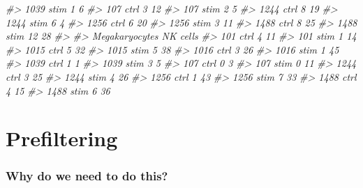 \documentclass[
]{book}
\newenvironment{Shaded}{\begin{snugshade}}{\end{snugshade}}
\newcommand{\CommentTok}[1]{\textcolor[rgb]{0.56,0.35,0.01}{\textit{#1}}}
\begin{document}
\begin{Shaded}
\begin{Highlighting}[]
\CommentTok{\#\textgreater{}   1039 stim               1                 6}
\CommentTok{\#\textgreater{}   107 ctrl                3                12}
\CommentTok{\#\textgreater{}   107 stim                2                 5}
\CommentTok{\#\textgreater{}   1244 ctrl               8                19}
\CommentTok{\#\textgreater{}   1244 stim               6                 4}
\CommentTok{\#\textgreater{}   1256 ctrl               6                20}
\CommentTok{\#\textgreater{}   1256 stim               3                11}
\CommentTok{\#\textgreater{}   1488 ctrl               8                25}
\CommentTok{\#\textgreater{}   1488 stim              12                28}
\CommentTok{\#\textgreater{}            }
\CommentTok{\#\textgreater{}             Megakaryocytes NK cells}
\CommentTok{\#\textgreater{}   101 ctrl               4       11}
\CommentTok{\#\textgreater{}   101 stim               1       14}
\CommentTok{\#\textgreater{}   1015 ctrl              5       32}
\CommentTok{\#\textgreater{}   1015 stim              5       38}
\CommentTok{\#\textgreater{}   1016 ctrl              3       26}
\CommentTok{\#\textgreater{}   1016 stim              1       45}
\CommentTok{\#\textgreater{}   1039 ctrl              1        1}
\CommentTok{\#\textgreater{}   1039 stim              3        5}
\CommentTok{\#\textgreater{}   107 ctrl               0        3}
\CommentTok{\#\textgreater{}   107 stim               0       11}
\CommentTok{\#\textgreater{}   1244 ctrl              3       25}
\CommentTok{\#\textgreater{}   1244 stim              4       26}
\CommentTok{\#\textgreater{}   1256 ctrl              1       43}
\CommentTok{\#\textgreater{}   1256 stim              7       33}
\CommentTok{\#\textgreater{}   1488 ctrl              4       15}
\CommentTok{\#\textgreater{}   1488 stim              6       36}
\end{Highlighting}
\end{Shaded}

\hypertarget{prefiltering}{%
\section{Prefiltering}\label{prefiltering}}

\hypertarget{why-do-we-need-to-do-this-8}{%
\subsubsection*{Why do we need to do this?}\label{why-do-we-need-to-do-this-8}}
\end{document}

